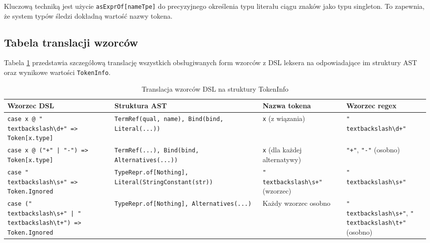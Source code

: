 Kluczową techniką jest użycie \texttt{asExprOf[nameTpe]} do precyzyjnego określenia typu literału ciągu znaków jako typu singleton. To zapewnia, że system typów śledzi dokładną wartość nazwy tokena.

\subsection{Tabela translacji wzorców}
\label{subsec:cnp-translation-table}

Tabela \ref{tab:pattern-translation} przedstawia szczegółową translację wszystkich obsługiwanych form wzorców z DSL leksera na odpowiadające im struktury AST oraz wynikowe wartości \texttt{TokenInfo}.

\begin{table}[htbp]
    \centering
    \caption{Translacja wzorców DSL na struktury TokenInfo}
    \label{tab:pattern-translation}
    \small
    \begin{tabular}{|p{4cm}|p{4cm}|p{3cm}|p{2.5cm}|}
        \hline
        \textbf{Wzorzec DSL} & \textbf{Struktura AST} & \textbf{Nazwa tokena} & \textbf{Wzorzec regex} \\
        \hline
        \texttt{case x @ "\\textbackslash\textbackslash d+" => Token[x.type]} &
        \texttt{TermRef(qual, name), Bind(bind, Literal(...))} &
        \texttt{x} (z wiązania) &
        \texttt{"\\textbackslash\textbackslash d+"} \\
        \hline
        \texttt{case x @ ("+" | "-") => Token[x.type]} &
        \texttt{TermRef(...), Bind(bind, Alternatives(...))} &
        \texttt{x} (dla każdej alternatywy) &
        \texttt{"+"}, \texttt{"-"} (osobno) \\
        \hline
        \texttt{case "\\textbackslash\textbackslash s+" => Token.Ignored} &
        \texttt{TypeRepr.of[Nothing], Literal(StringConstant(str))} &
        \texttt{"\\textbackslash\textbackslash s+"} (wzorzec) &
        \texttt{"\\textbackslash\textbackslash s+"} \\
        \hline
        \texttt{case ("\\textbackslash\textbackslash s+" | "\\textbackslash\textbackslash t+") => Token.Ignored} &
        \texttt{TypeRepr.of[Nothing], Alternatives(...)} &
        Każdy wzorzec osobno &
        \texttt{"\\textbackslash\textbackslash s+"}, \texttt{"\\textbackslash\textbackslash t+"} (osobno) \\

\end{tabular}
\end{table}

